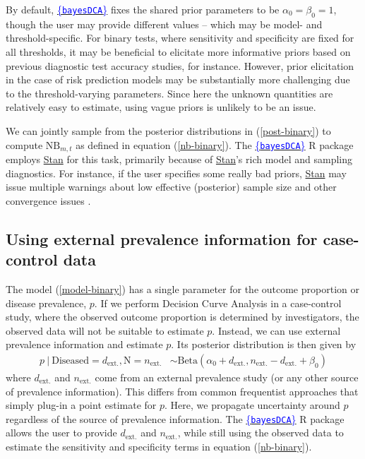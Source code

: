 \documentclass{article}
\def\bayesDCA{\href{https://giulianonetto.github.io/bayesdca/}{\textcolor{blue}{\{\texttt{bayesDCA}\}}} }
\begin{document}
By default, \bayesDCA fixes the shared prior parameters to be $\alpha_0=\beta_0=1$, though the user may provide different values --
which may be model- and threshold-specific. For binary tests, where sensitivity and specificity are fixed for all thresholds, it may be beneficial
to elicitate more informative priors based on previous diagnostic test accuracy studies, for instance. However, prior elicitation in the case of risk prediction models
may be substantially more challenging due to the threshold-varying parameters. Since here the unknown quantities are relatively easy to estimate, using vague priors
is unlikely to be an issue.

We can jointly sample from the posterior distributions in (\ref*{post-binary}) to compute $\textrm{NB}_{m, t}$ as defined in equation (\ref*{nb-binary}). 
The \bayesDCA R package employs \textcolor{blue}{\href{https://mc-stan.org/}{Stan}} for this task, primarily because of \textcolor{blue}{\href{https://mc-stan.org/}{Stan}}'s 
rich model and sampling diagnostics. For instance, if the user specifies some really bad priors, \textcolor{blue}{\href{https://mc-stan.org/}{Stan}} may issue multiple warnings
about low effective (posterior) sample size and other convergence issues \cite{Carpenter2017}.

\subsection{Using external prevalence information for case-control data}

The model (\ref*{model-binary}) has a single parameter for the outcome proportion or disease prevalence, $p$. If we perform Decision Curve Analysis
in a case-control study, where the observed outcome proportion is determined by investigators, the observed data will not be suitable to estimate $p$.
Instead, we can use external prevalence information and estimate $p$. Its posterior distribution is then given by
\begin{align*}
    p \ | \ \textrm{Diseased} = d_{\textrm{ext.}}, \textrm{N} = n_{\textrm{ext.}} &\sim \textrm{Beta}(\alpha_0 + d_{\textrm{ext.}}, n_{\textrm{ext.}} - d_{\textrm{ext.}} + \beta_0)
\end{align*}
where $d_{\textrm{ext.}}$ and $n_{\textrm{ext.}}$ come from an external prevalence study (or any other source of prevalence information). This differs from common frequentist approaches that simply
plug-in a point estimate for $p$. Here, we propagate uncertainty around $p$ regardless of the source of prevalence information. The 
\bayesDCA R package allows the user to provide $d_{\textrm{ext.}}$ and $n_{\textrm{ext.}}$, while still using the observed data to 
estimate the sensitivity and specificity terms in equation (\ref*{nb-binary}).
\end{document}
